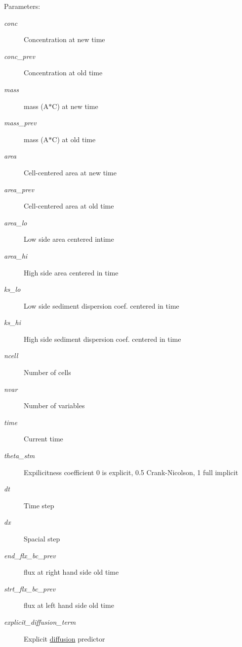 \begin{Desc}
\item[Parameters:]
\begin{description}
\item[{\em conc}]Concentration at new time\item[{\em conc\_\-prev}]Concentration at old time\item[{\em mass}]mass (A$\ast$C) at new time\item[{\em mass\_\-prev}]mass (A$\ast$C) at old time\item[{\em area}]Cell-centered area at new time\item[{\em area\_\-prev}]Cell-centered area at old time\item[{\em area\_\-lo}]Low side area centered intime\item[{\em area\_\-hi}]High side area centered in time \item[{\em ks\_\-lo}]Low side sediment dispersion coef. centered in time\item[{\em ks\_\-hi}]High side sediment dispersion coef. centered in time\item[{\em ncell}]Number of cells\item[{\em nvar}]Number of variables\item[{\em time}]Current time\item[{\em theta\_\-stm}]Expilicitness coefficient 0 is explicit, 0.5 Crank-Nicolson, 1 full implicit \item[{\em dt}]Time step \item[{\em dx}]Spacial step \item[{\em end\_\-flx\_\-bc\_\-prev}]flux at right hand side old time\item[{\em strt\_\-flx\_\-bc\_\-prev}]flux at left hand side old time\item[{\em explicit\_\-diffusion\_\-term}]Explicit \hyperlink{a00027}{diffusion} predictor \end{description}
\end{Desc}
